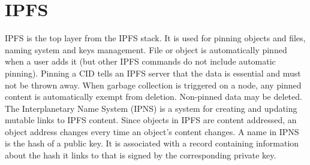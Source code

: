 \section{IPFS}
IPFS is the top layer from the IPFS stack. It is used for pinning objects and files, naming system and keys management. File or object is automatically pinned when a user adds it (but other IPFS commands do not include automatic pinning). Pinning a CID tells an IPFS server that the data is essential and must not be thrown away. When garbage collection is triggered on a node, any pinned content is automatically exempt from deletion. Non-pinned data may be deleted. The Interplanetary Name System (IPNS) is a system for creating and updating mutable links to IPFS content. Since objects in IPFS are content addressed, an object address changes every time an object's content changes. A name in IPNS is the hash of a public key. It is associated with a record containing information about the hash it links to that is signed by the corresponding private key.

